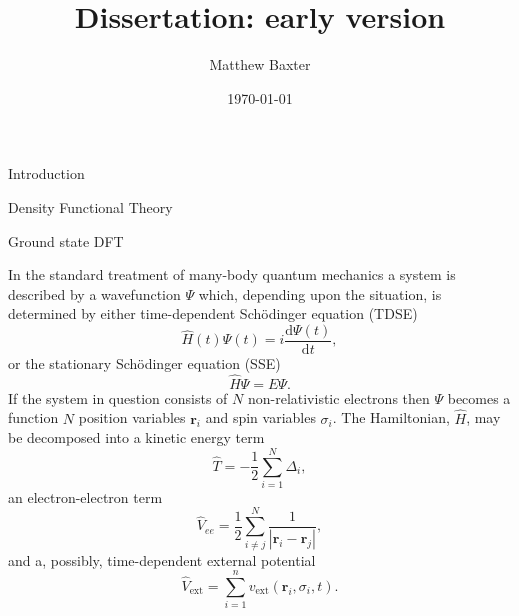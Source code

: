 \documentclass[letterpaper, 11 pt]{article}
\title{Dissertation: early version}
\author{Matthew Baxter}
\date{\today}
\begin{document}
\maketitle

\begin{section}{Introduction \label{sec:intro}}

\end{section}

\begin{section}{Density Functional Theory \label{chap:dft}}

   \begin{subsection}{Ground state DFT \label{sec:dft}}

      In the standard treatment of many-body quantum mechanics a system is described by a wavefunction
      $\Psi$ which, depending upon the situation, is determined by either time-dependent Sch\"{o}dinger
      equation (TDSE)
      \begin{equation} \label{eq:tdse}
         \hat{H}(t) \Psi(t) = i \frac{\mathrm{d} \Psi(t)}{\mathrm{d} t},
      \end{equation}
      or the stationary Sch\"{o}dinger equation (SSE)
      \begin{equation} \label{eq:sse}
         \hat{H} \Psi = E \Psi.
      \end{equation}
      If the system in question consists of $N$ non-relativistic electrons then $\Psi$ becomes a
      function $N$ position variables $\mathbf{r}_i$ and spin variables $\sigma_i$. The Hamiltonian,
      $\hat{H}$, may be decomposed into a kinetic energy term
      \begin{equation} \label{eq:Top} %
         \hat{T} = -\frac{1}{2} \sum\limits^{N}_{i=1} \Delta_i,
      \end{equation}
      an electron-electron term
      \begin{equation} \label{eq:Vee} %
         \hat{V}_{ee} = \frac{1}{2} \sum\limits^{N}_{i \neq j}
                        \frac{1}{\left| \mathbf{r}_i - \mathbf{r}_j \right|},
      \end{equation}
      and a, possibly, time-dependent external potential
      \begin{equation} \label{eq:Vext}
         \hat{V}_\mathrm{ext} = \sum\limits^{n}_{i = 1} v_\mathrm{ext} (\mathbf{r}_i, \sigma_i, t).
      \end{equation}


\end{subsection}
\end{section}
\end{document}
